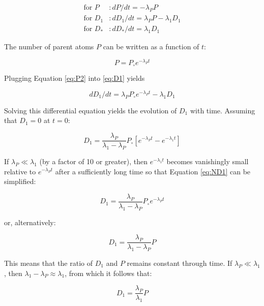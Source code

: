 \documentclass{book}
\begin{document}
\begin{align}
\mbox{for~} P &: dP/dt = -\lambda_P P\\
\mbox{for~} D_1 &: dD_1/dt = \lambda_P P - \lambda_1 D_1 \label{eq:D1}\\
\mbox{for~} D_* &: dD_*/dt = \lambda_1 D_1 \label{eq:D*}
\end{align}

The number of parent atoms $P$ can be written as a function of $t$:

\begin{equation}
P = P_\circ e^{-\lambda_P t}
\label{eq:P2}
\end{equation}

Plugging Equation \ref{eq:P2} into \ref{eq:D1} yields

\begin{equation}
dD_1/dt = \lambda_P P_\circ e^{-\lambda_P t} - \lambda_1 D_1
\label{eq:dD1dt}
\end{equation}

Solving this differential equation yields the evolution of $D_1$ with
time. Assuming that $D_1=0$ at $t=0$:

\begin{equation}
D_1 = \frac{\lambda_P}{\lambda_1 - \lambda_P} P_\circ \left[
  e^{-\lambda_P t} - e^{-\lambda_1 t}\right]
\label{eq:ND1}
\end{equation}

If $\lambda_P \ll \lambda_1$ (by a factor of 10 or greater), then
$e^{-\lambda_1 t}$ becomes vanishingly small relative to
$e^{-\lambda_P t}$ after a sufficiently long time so that Equation
\ref{eq:ND1} can be simplified:

\begin{equation}
D_1 = \frac{\lambda_P}{\lambda_1 - \lambda_P} P_\circ e^{-\lambda_P t}
\label{eq:ND1b}
\end{equation}

\noindent or, alternatively:

\begin{equation}
D_1 = \frac{\lambda_P}{\lambda_1 - \lambda_P} P
\label{eq:ND1c}
\end{equation}

This means that the ratio of $D_1$ and $P$ remains constant
through time. If $\lambda_P \ll \lambda_1$, then $\lambda_1 -
\lambda_P \approx \lambda_1$, from which it follows that:

\begin{equation}
D_1 = \frac{\lambda_P}{\lambda_1} P
\label{eq:ND1d}
\end{equation}
\end{document}
